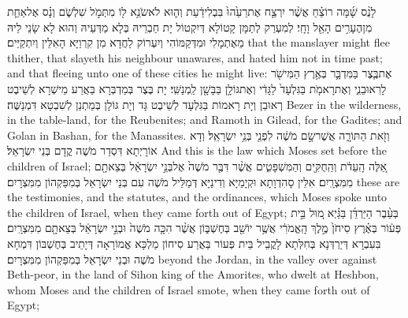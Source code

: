 {לָנֻ֨ס שָׁ֜מָּה רוֹצֵ֗חַ אֲשֶׁ֨ר יִרְצַ֤ח אֶת\maqqaf רֵעֵ֙הוּ֙ בִּבְלִי\maqqaf דַ֔עַת וְה֛וּא לֹא\maqqaf שֹׂנֵ֥א ל֖וֹ מִתְּמֹ֣ל שִׁלְשֹׁ֑ם וְנָ֗ס אֶל\maqqaf אַחַ֛ת מִן\maqqaf הֶעָרִ֥ים הָאֵ֖ל וָחָֽי׃}
{לְמִעְרַק לְתַמָּן קָטוֹלָא דְּיִקְטוֹל יָת חַבְרֵיהּ בְּלָא מַדְּעֵיהּ וְהוּא לָא שָׂנֵי לֵיהּ מֵאֶתְמָלִי וּמִדְּקַמּוֹהִי וְיִעְרוֹק לַחֲדָא מִן קִרְוַיָּא הָאִלֵּין וְיִתְקַיַּים׃}
{that the manslayer might flee thither, that slayeth his neighbour unawares, and hated him not in time past; and that fleeing unto one of these cities he might live:}{}
{אֶת\maqqaf בֶּ֧צֶר בַּמִּדְבָּ֛ר בְּאֶ֥רֶץ הַמִּישֹׁ֖ר לָרֽאוּבֵנִ֑י וְאֶת\maqqaf רָאמֹ֤ת בַּגִּלְעָד֙ לַגָּדִ֔י וְאֶת\maqqaf גּוֹלָ֥ן בַּבָּשָׁ֖ן לַֽמְנַשִּֽׁי׃}
{יָת בֶּצֶר בְּמַדְבְּרָא בַּאֲרַע מֵישְׁרָא לְשֵׁיבֶט רְאוּבֵן וְיָת רָאמוֹת בַּגִּלְעָד לְשֵׁיבֶט גָּד וְיָת גּוֹלָן בְּמַתְנַן לְשִׁבְטָא דִּמְנַשֶּׁה׃}
{Bezer in the wilderness, in the table-land, for the Reubenites; and Ramoth in Gilead, for the Gadites; and Golan in Bashan, for the Manassites.}{}
{וְזֹ֖את הַתּוֹרָ֑ה אֲשֶׁר\maqqaf שָׂ֣ם מֹשֶׁ֔ה לִפְנֵ֖י בְּנֵ֥י יִשְׂרָאֵֽל׃}
{וְדָא אוֹרָיְתָא דִּסְדַר מֹשֶׁה קֳדָם בְּנֵי יִשְׂרָאֵל׃}
{And this is the law which Moses set before the children of Israel;}{}
{אֵ֚לֶּה הָֽעֵדֹ֔ת וְהַֽחֻקִּ֖ים וְהַמִּשְׁפָּטִ֑ים אֲשֶׁ֨ר דִּבֶּ֤ר מֹשֶׁה֙ אֶל\maqqaf בְּנֵ֣י יִשְׂרָאֵ֔ל בְּצֵאתָ֖ם מִמִּצְרָֽיִם׃}
{אִלֵּין סָהִדְוָתָא וּקְיָמַיָּא וְדִינַיָּא דְּמַלֵּיל מֹשֶׁה עִם בְּנֵי יִשְׂרָאֵל בְּמִפַּקְהוֹן מִמִּצְרָיִם׃}
{these are the testimonies, and the statutes, and the ordinances, which Moses spoke unto the children of Israel, when they came forth out of Egypt;}{}
{בְּעֵ֨בֶר הַיַּרְדֵּ֜ן בַּגַּ֗יְא מ֚וּל בֵּ֣ית פְּע֔וֹר בְּאֶ֗רֶץ סִיחֹן֙ מֶ֣לֶךְ הָֽאֱמֹרִ֔י אֲשֶׁ֥ר יוֹשֵׁ֖ב בְּחֶשְׁבּ֑וֹן אֲשֶׁ֨ר הִכָּ֤ה מֹשֶׁה֙ וּבְנֵ֣י יִשְׂרָאֵ֔ל בְּצֵאתָ֖ם מִמִּצְרָֽיִם׃}
{בִּעִבְרָא דְּיַרְדְּנָא בְּחִלְּתָא לָקֳבֵיל בֵּית פְּעוֹר בַּאֲרַע סִיחוֹן מַלְכָּא אֱמוֹרָאָה דְּיָתֵיב בְּחֶשְׁבּוֹן דִּמְחָא מֹשֶׁה וּבְנֵי יִשְׂרָאֵל בְּמִפַּקְהוֹן מִמִּצְרָיִם׃}
{beyond the Jordan, in the valley over against Beth-peor, in the land of Sihon king of the Amorites, who dwelt at Heshbon, whom Moses and the children of Israel smote, when they came forth out of Egypt;}{}
